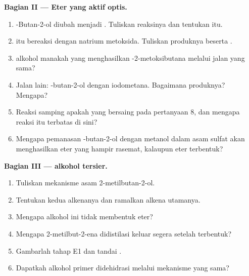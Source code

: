 \begin{problem}
\medskip
\noindent\textbf{Bagian II --- Eter yang aktif optis.}
\begin{enumerate}[resume]
  \item {}-Butan-2-ol diubah menjadi . Tuliskan reaksinya
        dan tentukan   itu.
  \item {} itu bereaksi dengan natrium metoksida. Tuliskan produknya
        beserta .
  \item {} alkohol manakah yang menghasilkan
        -2-metoksibutana melalui jalan yang sama?
  \item Jalan lain:  -butan-2-ol dengan iodometana.
        Bagaimana  produknya? Mengapa?
  \item Reaksi samping apakah yang bersaing pada pertanyaan 8, dan mengapa
        reaksi itu terbatas di sini?
  \item Mengapa pemanasan -butan-2-ol dengan metanol dalam asam
        sulfat akan menghasilkan eter yang hampir rasemat, kalaupun eter
        terbentuk?
\end{enumerate}

\medskip
\noindent\textbf{Bagian III ---  alkohol tersier.}
\begin{enumerate}[resume]
  \item Tuliskan mekanisme  asam 2-metilbutan-2-ol.
  \item Tentukan kedua alkenanya dan ramalkan alkena utamanya.
  \item Mengapa alkohol ini tidak membentuk eter?
  \item Mengapa 2-metilbut-2-ena didistilasi keluar segera setelah
        terbentuk?
  \item Gambarlah  tahap E1 dan tandai .
  \item Dapatkah alkohol primer didehidrasi melalui mekanisme yang sama?
\end{enumerate}


\end{problem}
